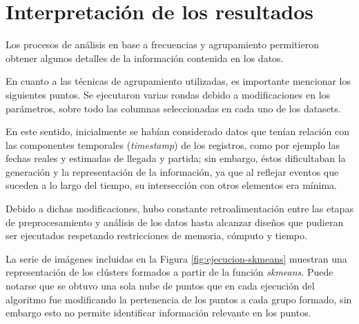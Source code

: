 \documentclass[12pt]{article}
\numberwithin{equation}{section}
\numberwithin{table}{section}
\numberwithin{figure}{section}
\begin{document}
\section{Interpretación de los resultados}
Los procesos de análisis en base a frecuencias y agrupamiento permitieron obtener algunos detalles de la información contenida en los datos.

En cuanto a las técnicas de agrupamiento utilizadas, es importante mencionar los siguientes puntos.
Se ejecutaron varias rondas debido a modificaciones en los parámetros, sobre todo las columnas seleccionadas en cada uno de los datasets.

En este sentido, inicialmente se habían considerado datos que tenían relación con las componentes temporales (\emph{timestamp}) de los registros, como por ejemplo las fechas reales y estimadas de llegada y partida; sin embargo, éstos dificultaban la generación y la representación de la información, ya que al reflejar eventos que suceden a lo largo del tiempo, su intersección con otros elementos era mínima.

Debido a dichas modificaciones, hubo constante retroalimentación entre las etapas de preprocesamiento y análisis de los datos hasta alcanzar diseños que pudieran ser ejecutados respetando restricciones de memoria, cómputo y tiempo.

La serie de imágenes incluidas en la Figura \ref{fig:ejecucion-skmeans} muestran una representación de los clústers formados a partir de la función \emph{skmeans}.
Puede notarse que se obtuvo una sola nube de puntos que en cada ejecución del algoritmo fue modificando la pertenencia de los puntos a cada grupo formado, sin embargo esto no permite identificar información relevante en los puntos.
\end{document}
